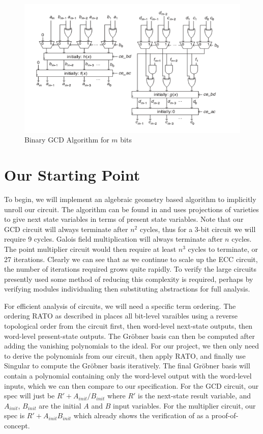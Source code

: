 \documentclass[12pt]{report}
\begin{document}
\begin{figure}
\includegraphics{images/gcd.png}
\caption{Binary GCD Algorithm for $m$ bits \cite{Ajay}}
\label{fig:gcd}
\end{figure}

\section{Our Starting Point}

To begin, we will implement an algebraic geometry based algorithm to implicitly unroll our circuit. The algorithm can be found in \cite{Kalla} and uses projections of varieties to give next state variables in terms of present state variables. Note that our GCD circuit will always terminate after $n^2$ cycles, thus for a 3-bit circuit we will require 9 cycles. Galois field multiplication will always terminate after $n$ cycles. The point multiplier circuit would then require at least $n^3$ cycles to terminate, or 27 iterations. Clearly we can see that as we continue to scale up the ECC circuit, the number of iterations required grows quite rapidly. To verify the large circuits presently used some method of reducing this complexity is required, perhaps by verifying modules individualing then substituting abstractions for full analysis. 

For efficient analysis of circuits, we will need a specific term ordering. The ordering RATO as described in \cite{Kalla} places all bit-level varaibles using a reverse topological order from the circuit first, then word-level next-state outputs, then word-level present-state outputs. The Gr{\"o}bner basis can then be computed after adding the vanishing polynomials to the ideal. For our project, we then only need to derive the polynomials from our circuit, then apply RATO, and finally use Singular to compute the Gr{\"o}bner basis iteratively. The final Gr{\"o}bner basis will contain a polynomial containing only the word-level output with the word-level inputs, which we can then compare to our specification. For the GCD circuit, our spec will just be $R' + A_{init}/B_{init}$ where $R'$ is the next-state result variable, and $A_{init}$, $B_{init}$ are the initial $A$ and $B$ input variables. For the multiplier circuit, our spec is $R' + A_{init}B_{init}$ which \cite{Kalla} already shows the verification of as a proof-of-concept. 
\end{document}
